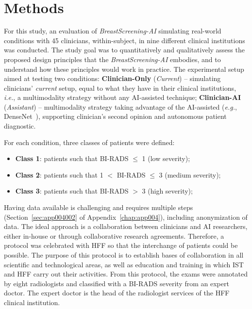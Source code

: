 \section{Methods}
\label{sec:chap005005}

For this study, an evaluation of {\it BreastScreening-AI} simulating real-world conditions with 45 clinicians, within-subject, in nine different clinical institutions was conducted.
The study goal was to quantitatively and qualitatively assess the proposed design principles that the {\it BreastScreening-AI} embodies, and to understand how these principles would work in practice.
The experimental setup aimed at testing two conditions: {\bf Clinician-Only} ({\it Current}) -- simulating clinicians' {\it current} setup, equal to what they have in their clinical institutions, {\it i.e.}, a multimodality strategy without any \ac{AI}-assisted technique; {\bf Clinician-AI} ({\it Assistant}) -- multimodality strategy taking advantage of the \ac{AI}-assisted ({\it e.g.}, DenseNet~\cite{9098470}), supporting clinician's second opinion and autonomous patient diagnostic.

\vspace{2.00mm}

\noindent
For each condition, three classes of patients were defined:

\begin{itemize}
\item {\bf Class 1}: patients such that \ac{BI-RADS} $\leq$ 1 (low severity);
\item {\bf Class 2}: patients such that 1 $<$ \ac{BI-RADS} $\leq$ 3 (medium severity);
\item {\bf Class 3}: patients such that \ac{BI-RADS} $>$ 3 (high severity);
\end{itemize}

Having data available is challenging and requires multiple steps (Section~\ref{sec:app004002} of Appendix~\ref{chap:app004}), including anonymization of data.
The ideal approach is a collaboration between clinicians and \ac{AI} researchers, either in-house or through collaborative research agreements.
Therefore, a protocol was celebrated with \acs{HFF} so that the interchange of patients could be possible.
The purpose of this protocol is to establish bases of collaboration in all scientific and technological areas, as well as education and training in which \ac{IST} and \acs{HFF} carry out their activities.
From this protocol, the exams were annotated by eight radiologists and classified with a \ac{BI-RADS} severity from an expert doctor.
The expert doctor is the head of the radiologist services of the \acs{HFF} clinical institution.

